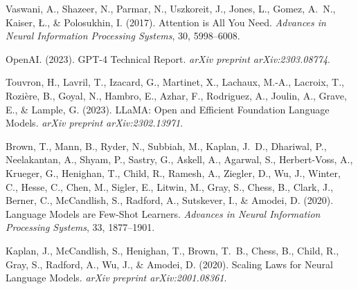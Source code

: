 


Vaswani, A., Shazeer, N., Parmar, N., Uszkoreit, J., Jones, L., Gomez, A.~N., Kaiser, {\L}., \& Polosukhin, I. (2017). Attention is All You Need. \textit{Advances in Neural Information Processing Systems}, 30, 5998--6008.

OpenAI. (2023). GPT-4 Technical Report. \textit{arXiv preprint arXiv:2303.08774}.

Touvron, H., Lavril, T., Izacard, G., Martinet, X., Lachaux, M.-A., Lacroix, T., Rozi{\`e}re, B., Goyal, N., Hambro, E., Azhar, F., Rodriguez, A., Joulin, A., Grave, E., \& Lample, G. (2023). LLaMA: Open and Efficient Foundation Language Models. \textit{arXiv preprint arXiv:2302.13971}.

Brown, T., Mann, B., Ryder, N., Subbiah, M., Kaplan, J.~D., Dhariwal, P., Neelakantan, A., Shyam, P., Sastry, G., Askell, A., Agarwal, S., Herbert-Voss, A., Krueger, G., Henighan, T., Child, R., Ramesh, A., Ziegler, D., Wu, J., Winter, C., Hesse, C., Chen, M., Sigler, E., Litwin, M., Gray, S., Chess, B., Clark, J., Berner, C., McCandlish, S., Radford, A., Sutskever, I., \& Amodei, D. (2020). Language Models are Few-Shot Learners. \textit{Advances in Neural Information Processing Systems}, 33, 1877--1901.

Kaplan, J., McCandlish, S., Henighan, T., Brown, T.~B., Chess, B., Child, R., Gray, S., Radford, A., Wu, J., \& Amodei, D. (2020). Scaling Laws for Neural Language Models. \textit{arXiv preprint arXiv:2001.08361}.

